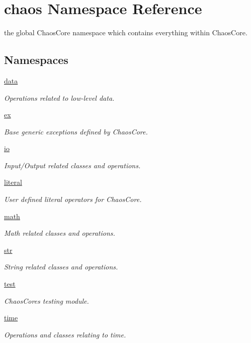 \hypertarget{namespacechaos}{}\section{chaos Namespace Reference}
\label{namespacechaos}


the global Chaos\+Core namespace which contains everything within Chaos\+Core.  


\subsection*{Namespaces}
\begin{DoxyCompactItemize}
\item 
 \hyperlink{namespacechaos_1_1data}{data}
\begin{DoxyCompactList}\small\item\em Operations related to low-\/level data. \end{DoxyCompactList}\item 
 \hyperlink{namespacechaos_1_1ex}{ex}
\begin{DoxyCompactList}\small\item\em Base generic exceptions defined by Chaos\+Core. \end{DoxyCompactList}\item 
 \hyperlink{namespacechaos_1_1io}{io}
\begin{DoxyCompactList}\small\item\em Input/\+Output related classes and operations. \end{DoxyCompactList}\item 
 \hyperlink{namespacechaos_1_1literal}{literal}
\begin{DoxyCompactList}\small\item\em User defined literal operators for Chaos\+Core. \end{DoxyCompactList}\item 
 \hyperlink{namespacechaos_1_1math}{math}
\begin{DoxyCompactList}\small\item\em Math related classes and operations. \end{DoxyCompactList}\item 
 \hyperlink{namespacechaos_1_1str}{str}
\begin{DoxyCompactList}\small\item\em String related classes and operations. \end{DoxyCompactList}\item 
 \hyperlink{namespacechaos_1_1test}{test}
\begin{DoxyCompactList}\small\item\em Chaos\+Core\textquotesingle{}s testing module. \end{DoxyCompactList}\item 
 \hyperlink{namespacechaos_1_1time}{time}
\begin{DoxyCompactList}\small\item\em Operations and classes relating to time. \end{DoxyCompactList}\end{DoxyCompactItemize}
